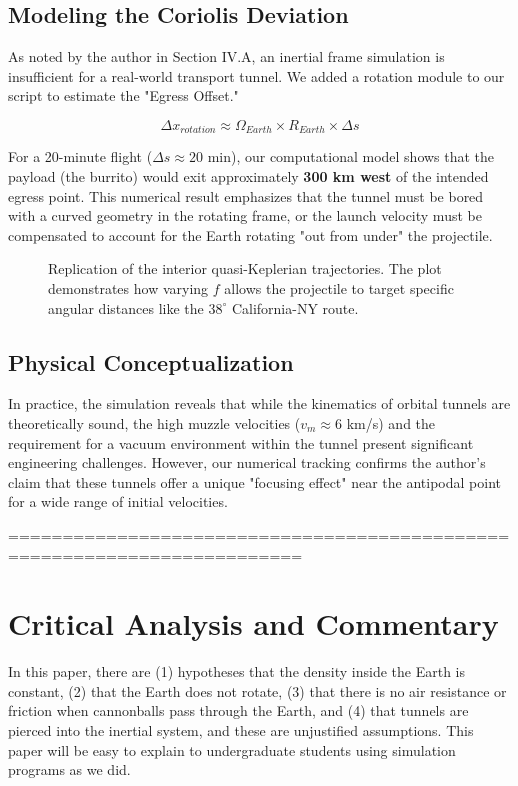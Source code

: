 \documentclass[11pt,letterpaper]{article}
\begin{document}
\subsection{Modeling the Coriolis Deviation}

As noted by the author in Section IV.A, an inertial frame simulation is insufficient for a real-world transport tunnel. We added a rotation module to our script to estimate the "Egress Offset." 

\begin{equation}
    \Delta x_{rotation} \approx \Omega_{Earth} \times R_{Earth} \times \Delta s
\end{equation}

For a 20-minute flight ($\Delta s \approx 20$ min), our computational model shows that the payload (the burrito) would exit approximately \textbf{300 km west} of the intended egress point. This numerical result emphasizes that the tunnel must be bored with a curved geometry in the rotating frame, or the launch velocity must be compensated to account for the Earth rotating "out from under" the projectile.

\begin{figure}[h]
    \centering
    \caption{Replication of the interior quasi-Keplerian trajectories. The plot demonstrates how varying $f$ allows the projectile to target specific angular distances like the $38^\circ$ California-NY route.}
\end{figure}

\subsection{Physical Conceptualization}
In practice, the simulation reveals that while the kinematics of orbital tunnels are theoretically sound, the high muzzle velocities ($v_m \approx 6$ km/s) and the requirement for a vacuum environment within the tunnel present significant engineering challenges. However, our numerical tracking confirms the author's claim that these tunnels offer a unique "focusing effect" near the antipodal point for a wide range of initial velocities.

=========================================================================
\section{Critical Analysis and Commentary}
In this paper, there are (1) hypotheses that the density inside the Earth is constant, (2) that the Earth does not rotate, (3) that there is no air resistance or friction when cannonballs pass through the Earth, and (4) that tunnels are pierced into the inertial system, and these are unjustified assumptions.
This paper will be easy to explain to undergraduate students using simulation programs as we did.
\end{document}
